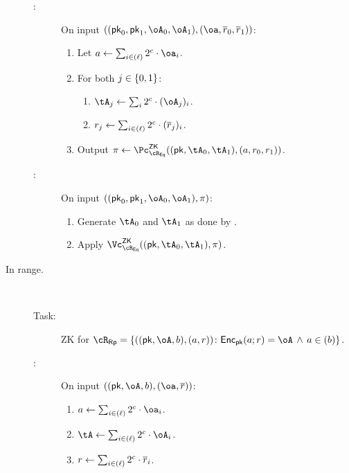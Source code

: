 \begin{description}
\begin{description}
	\item[\Pc:]  On input $((\pk_0,\pk_1,\oA_0,\oA_1),(\oa,\orr_0,\orr_1))$: 
	

	\begin{enumerate}
		
		\item Let  $a \asn  \sum_{i\in (\ell)}    2^c \cdot \oa_i$. 
		
		\item For both $j\in \zo$:
		\begin{enumerate}
			\item    $\tA_j \asn  \sum_i  2^c \cdot (\oA_j)_i$. 
			\item    $r_j \leftarrow  \sum_{i\in (\ell)}  2^c \cdot (\overline{r}_j)_i$. 
			
		\end{enumerate}
		
		\item Output $\pi \asn \pZK{\rEgEq}((\pk,\tA_0,\tA_1), (a,r_0,r_1))$.
				 
	\end{enumerate}
	
	\item[\Vc:] On input $((\pk_0,\pk_1,\oA_0,\oA_1),\pi)$: 
	
	\begin{enumerate}
		\item Generate $\tA_0$ and  $\tA_1$ as done by \Pc.
		
	\item Apply $\vZK{\rEgEq}((\pk,\tA_0,\tA_1), \pi)$.
	
	\end{enumerate}
	
	\end{description}
		


  


\item[In range.]~  

\begin{description}
	\item[Task:] ZK for $\rRp =\rRpDef$.
	
	\item[\Pc:] On input $((\pk,\oA,b),(\oa,\orr))$:
	
	\begin{enumerate}
			\item   $a \asn  \sum_{i\in (\ell)}   2^c \cdot \oa_i$. 
		\item    $\tA \asn  \sum_{i\in (\ell)}    2^c \cdot \oA_i$. 
		\item    $r \leftarrow  \sum_{i\in (\ell)}  2^c \cdot \overline{r}_i$. 
        

\end{enumerate}
\end{description}
\end{description}
